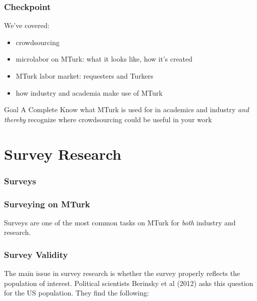 \documentclass[slides]{beamer} %
\begin{document}
\begin{frame}\frametitle{Checkpoint}

We've covered:

\begin{itemize}
\item crowdsourcing \pause
\item microlabor on MTurk: what it looks like, how it's created  \pause
\item MTurk labor market: requesters and Turkers \pause
\item how industry and academia make use of MTurk \pause
\end{itemize}

\begin{block}{Goal A Complete}
\small
Know what MTurk is used for in academics and industry \textit{and thereby} recognize where crowdsourcing could be useful in your work
\end{block}

\end{frame}

\section{Survey Research}

\begin{frame}\frametitle{Surveys}


\end{frame}

\begin{frame}\frametitle{Surveying on MTurk}


Surveys are one of the most common tasks on MTurk for \textit{both} industry and research.

\end{frame}

\begin{frame}\frametitle{Survey Validity}
\small
The main issue in survey research is whether the survey properly reflects the population of interest. Political scientists Berinsky et al (2012) asks this question for the US population. They find the following:


\end{frame}
\end{document}
